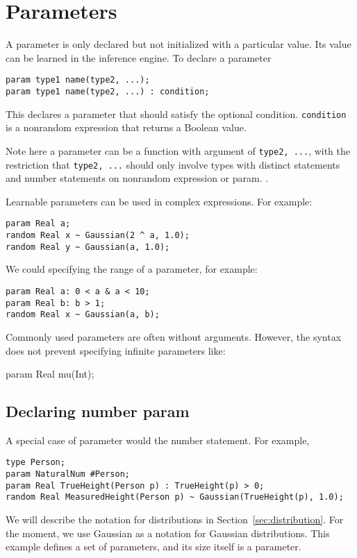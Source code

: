 \documentclass[12pt]{article}
\begin{document}
\section{Parameters}
A parameter is only declared but not initialized with a particular value. Its value can be learned in the inference engine. To declare a parameter
\begin{verbatim}
param type1 name(type2, ...);
param type1 name(type2, ...) : condition;
\end{verbatim} 
This declares a parameter that should satisfy the optional condition. \texttt{condition} is a nonrandom expression that returns a Boolean value. 

Note here a parameter can be a function with argument of \texttt{type2, ...}, with the restriction that \texttt{type2, ...} should only involve types with distinct statements and number statements on nonrandom expression or param.
. 

Learnable parameters can be used in complex expressions. For example:
\begin{verbatim}
param Real a;
random Real x ~ Gaussian(2 ^ a, 1.0);
random Real y ~ Gaussian(a, 1.0);
\end{verbatim}

We could specifying the range of a parameter, for example:
\begin{verbatim}
param Real a: 0 < a & a < 10;
param Real b: b > 1;
random Real x ~ Gaussian(a, b);
\end{verbatim}

Commonly used parameters are often without arguments. However, the syntax does not prevent specifying infinite parameters like:
\begin{blog}
param Real mu(Int);
\end{blog}

\subsection{Declaring number param}
A special case of parameter would the number statement. For example,
\begin{verbatim}
type Person;
param NaturalNum #Person;
param Real TrueHeight(Person p) : TrueHeight(p) > 0;
random Real MeasuredHeight(Person p) ~ Gaussian(TrueHeight(p), 1.0);
\end{verbatim}
We will describe the notation for distributions in Section~\ref{sec:distribution}. For the moment, we use Gaussian as a notation for Gaussian distributions.
This example defines a set of parameters, and its size itself is a parameter.
\end{document}
